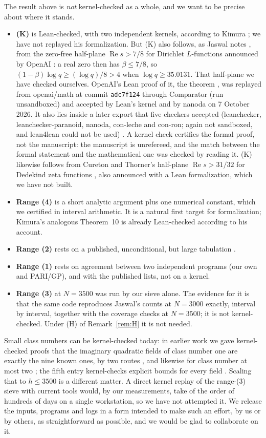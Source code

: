 \documentclass[11pt]{article}
\theoremstyle{definition}
\begin{document}
The result above is \emph{not} kernel-checked as a whole, and we want to be precise about where it stands.
\begin{itemize}[nosep]
\item \textbf{(K)} is Lean-checked, with two independent kernels, according to Kimura \cite{Kimura2026}; we have
not replayed his formalization. But (K) also follows, as Jaswal notes \cite{Jaswal2026}, from the zero-free half-plane
$\operatorname{Re} s > 7/8$ for Dirichlet $L$-functions announced by OpenAI \cite{OpenAIQRH}: a real zero then has
$\beta \le 7/8$, so $(1-\beta)\log q \ge (\log q)/8 > 4$ when $\log q \ge 35.0131$. That half-plane we have checked
ourselves. OpenAI's Lean proof of it, the theorem
, was replayed from openai/math at commit \texttt{adc7f124} through Comparator (run unsandboxed) and accepted by
Lean's kernel and by nanoda on 7 October 2026. It also lies inside a later export that five checkers accepted
(leanchecker, leanchecker-paranoid, nanoda, con-leche and con-ron; again not sandboxed, and lean4lean could not be used)
\cite{MurphyLchi}. A kernel check certifies the formal proof, not the manuscript: the manuscript is unrefereed, and the
match between the formal statement and the mathematical one was checked by reading it. (K) likewise follows from
Cureton and Thorner's half-plane $\operatorname{Re} s > 31/32$ for Dedekind zeta functions
\cite{CuretonThorner2026}, also announced with a Lean formalization, which we have not built.
\item \textbf{Range (4)} is a short analytic argument plus one numerical constant, which we certified in interval
arithmetic. It is a natural first target for formalization; Kimura's analogous Theorem~10 is already Lean-checked
according to his account.
\item \textbf{Range (2)} rests on a published, unconditional, but large tabulation \cite{MJ16}.
\item \textbf{Range (1)} rests on agreement between two independent programs (our own and PARI/GP), and with the
published lists, not on a kernel.
\item \textbf{Range (3)} at $N = 3500$ was run by our sieve alone. The evidence for it is that the same code reproduces
Jaswal's counts at $N = 3000$ exactly, interval by interval, together with the coverage checks at $N = 3500$; it is not
kernel-checked. Under (H) of Remark~\ref{rem:H} it is not needed.
\end{itemize}
Small class numbers can be kernel-checked today: in earlier work we gave kernel-checked proofs that the imaginary
quadratic fields of class number one are exactly the nine known ones, by two routes \cite{MurphyFirst,MurphyCN1}, and likewise
for class number at most two \cite{MurphyHCN}; the fifth entry kernel-checks explicit bounds for every field \cite{MurphyBounds}. Scaling that to $h \le 3500$ is a
different matter. A direct kernel replay of the range-(3) sieve with current tools would, by our measurements, take of the
order of hundreds of days on a single workstation, so we have not attempted it. We release the inputs, programs and logs
in a form intended to make such an effort, by us or by others, as straightforward as possible, and we would be glad to
collaborate on it.
\end{document}
